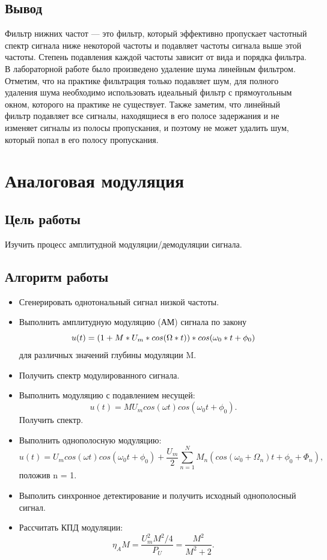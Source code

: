 \documentclass[10pt,a4paper]{article}
\begin{document}
\subsection{Вывод}
Фильтр нижних частот — это фильтр, который  эффективно пропускает частотный спектр сигнала ниже некоторой частоты  и подавляет частоты сигнала выше этой частоты. Степень подавления каждой частоты зависит от вида и порядка фильтра. В лабораторной работе было произведено удаление шума линейным фильтром. Отметим, что на практике фильтрация только подавляет шум, для полного удаления шума необходимо использовать идеальный фильтр с прямоугольным окном, которого на практике не существует.  Также заметим, что линейный фильтр подавляет все сигналы, находящиеся в его полосе задержания и не изменяет сигналы из полосы пропускания, и поэтому не может удалить шум, который попал в его полосу пропускания. 
\section{Аналоговая модуляция}
\subsection{Цель работы}
Изучить процесс амплитудной модуляции/демодуляции сигнала.
\subsection{Алгоритм работы}
\begin{itemize}
\item Сгенерировать однотональный сигнал низкой частоты.
\item Выполнить амплитудную модуляцию (АМ) сигнала по закону 
\begin{displaymath}
u(t)=(1+M*U_{m}*cos(\Omega*t))*cos(\omega_{0}*t+\phi_{0})\newline
\end{displaymath}
  для различных значений глубины модуляции M.
\item Получить спектр модулированного сигнала.
\item Выполнить модуляцию с подавлением несущей: 
\begin{equation}
	u(t) = MU_m cos(\omega t)cos(\omega_0 t+\phi_0).
          \end{equation}
Получить спектр.
\item Выполнить однополосную модуляцию:
\begin{equation}
  u(t) = U_m cos(\omega t)cos(\omega_0 t+\phi_0)+\frac{U_m}{2}\sum_{n=1}^N M_n (cos(\omega_0 + \Omega_n )t + \phi_0 + \Phi_n ),
  \end{equation}
положив n = 1.
\item Выполить синхронное детектирование и получить исходный однополосный сигнал.
\item Рассчитать КПД модуляции:
\begin{equation}
					\eta_A M = \frac{U_m ^2 M^2 /4}{P_U} = \frac{M^2}{M^2 + 2}.
				\end{equation}
\end{itemize}
\end{document}
